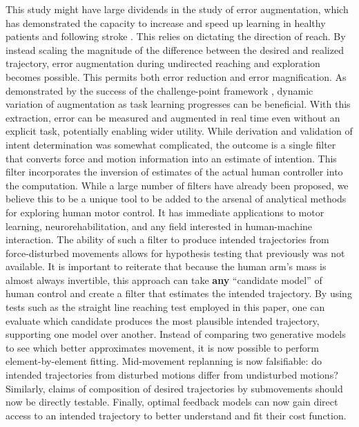 \documentclass[10pt]{article}
\begin{document}
This study might have large dividends in the study of error augmentation, which has demonstrated the capacity to increase and speed up learning in healthy patients \cite{patton2004robot} and following stroke \cite{patton2006evaluation}. This relies on dictating the direction of reach. By instead scaling the magnitude of the difference between the desired and realized trajectory, error augmentation during undirected reaching and exploration becomes possible. This permits both error reduction and error magnification. As demonstrated by the success of the challenge-point framework \cite{guadagnoli2004challenge}, dynamic variation of augmentation as task learning progresses can be beneficial. With this extraction, error can be measured and augmented in real time even without an explicit task, potentially enabling wider utility.
While derivation and validation of intent determination was somewhat complicated, the outcome is a single filter that converts force and motion information into an estimate of intention. This filter incorporates the inversion of estimates of the actual human controller into the computation. While a large number of filters have already been proposed, we believe this to be a unique tool to be added to the arsenal of analytical methods for exploring human motor control. It has immediate applications to motor learning, neurorehabilitation, and any field interested in human-machine interaction.  
The ability of such a filter to produce intended trajectories from force-disturbed movements allows for hypothesis testing that previously was not available. It is important to reiterate that because the human arm’s mass is almost always invertible, this approach can take \textbf{any} “candidate model” of human control and create a filter that estimates the intended trajectory. By using tests such as the straight line reaching test employed in this paper, one can evaluate which candidate produces the most plausible intended trajectory, supporting one model over another.  Instead of comparing two generative models to see which better approximates movement, it is now possible to perform element-by-element fitting. Mid-movement replanning is now falsifiable: do intended trajectories from disturbed motions differ from undisturbed motions? Similarly, claims of composition of desired trajectories by submovements should now be directly testable. Finally, optimal feedback models can now gain direct access to an intended trajectory to better understand and fit their cost function.
\end{document}
